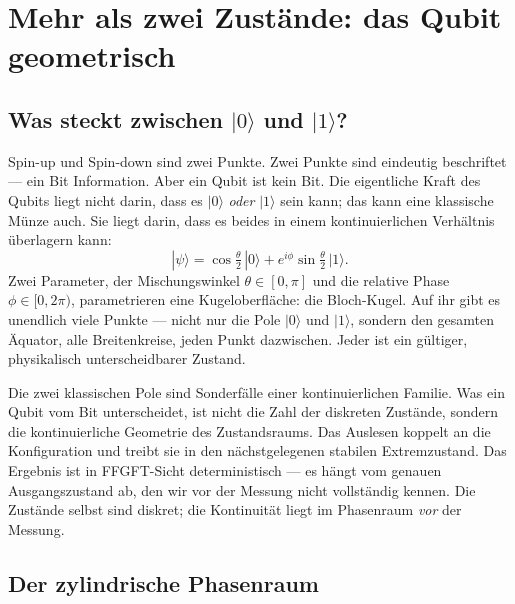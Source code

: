 \chapter{Mehr als zwei Zustände: das Qubit geometrisch}
\label{ch:qubit}

\section{Was steckt zwischen $|0\rangle$ und $|1\rangle$?}

Spin-up und Spin-down sind zwei Punkte. Zwei Punkte sind eindeutig
beschriftet --- ein Bit Information. Aber ein Qubit ist kein Bit. Die
eigentliche Kraft des Qubits liegt nicht darin, dass es $|0\rangle$
\emph{oder} $|1\rangle$ sein kann; das kann eine klassische Münze auch.
Sie liegt darin, dass es beides in einem kontinuierlichen Verhältnis
überlagern kann:
\begin{equation}
  |\psi\rangle = \cos\tfrac{\theta}{2}\,|0\rangle
  + e^{i\phi}\sin\tfrac{\theta}{2}\,|1\rangle.
\end{equation}
Zwei Parameter, der Mischungswinkel $\theta\in[0,\pi]$ und die relative
Phase $\phi\in[0,2\pi)$, parametrieren eine Kugeloberfläche: die
Bloch-Kugel. Auf ihr gibt es unendlich viele Punkte --- nicht nur die
Pole $|0\rangle$ und $|1\rangle$, sondern den gesamten Äquator, alle
Breitenkreise, jeden Punkt dazwischen. Jeder ist ein gültiger,
physikalisch unterscheidbarer Zustand.

\begin{keypoint}
Die zwei klassischen Pole sind Sonderfälle einer kontinuierlichen
Familie. Was ein Qubit vom Bit unterscheidet, ist nicht die Zahl der
diskreten Zustände, sondern die kontinuierliche Geometrie des
Zustandsraums. Das Auslesen koppelt an die Konfiguration und treibt sie
in den nächstgelegenen stabilen Extremzustand. Das Ergebnis ist in
FFGFT-Sicht deterministisch --- es hängt vom genauen Ausgangszustand
ab, den wir vor der Messung nicht vollständig kennen. Die Zustände
selbst sind diskret; die Kontinuität liegt im Phasenraum \emph{vor}
der Messung.
\end{keypoint}

\section{Der zylindrische Phasenraum}

